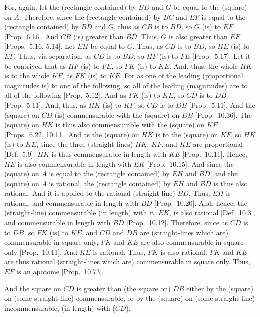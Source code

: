 \begin{Parallel}{}{}
{For, again, let the (rectangle contained) by $BD$ and $G$  be equal
to the (square) on $A$. Therefore, since the (rectangle contained) by $BC$
and $EF$ is equal to the (rectangle contained) by $BD$ and $G$, thus as
$CB$ is to $BD$, so $G$ (is) to $EF$ [Prop.~6.16].
And $CB$ (is) greater than $BD$. Thus, $G$ is also greater than $EF$
[Props.~5.16, 5.14].
Let $EH$ be equal to $G$. Thus, as $CB$ is to $BD$, so $HE$
(is) to $EF$. Thus, via separation, as $CD$ is to $BD$, so $HF$ (is) to $FE$
[Prop.~5.17]. Let it be contrived that as
$HF$ (is) to $FE$, so $FK$ (is) to $KE$. And, thus, the
whole $HK$ is to the whole $KF$, as $FK$ (is) to $KE$.
For as one of the leading (proportional magnitudes is) to one of
the following, so all of the leading (magnitudes) are to all of the
following [Prop.~5.12]. And as $FK$
(is) to $KE$, so $CD$ is to $DB$ [Prop.~5.11].  And, thus, as $HK$ (is) to $KF$, so
$CD$ is to $DB$ [Prop.~5.11].
And the (square) on  $CD$ (is) 
 commensurable with the (square) on $DB$ [Prop.~10.36]. The (square) on $HK$ is
 thus also commensurable with the (square) on $KF$ [Props.~6.22, 10.11].
  And as the (square) on $HK$ is to the (square) on $KF$, so $HK$ (is)
  to $KE$, since the three (straight-lines) $HK$, $KF$, and $KE$ are
  proportional [Def.~5.9]. $HK$ is thus commensurable
  in length with $KE$ [Prop.~10.11]. 
  Hence, $HE$ is also commensurable in length with $EK$
  [Prop.~10.15]. And since the (square) on $A$
  is equal to the (rectangle contained) by $EH$ and $BD$, and the (square)
  on $A$ is rational, the (rectangle contained) by $EH$ and $BD$ is thus
  also rational. And it is applied to the rational (straight-line) $BD$.
  Thus, $EH$ is  rational, and commensurable in length with $BD$ [Prop.~10.20]. And, hence, the (straight-line)
  commensurable (in length) with it, $EK$, is also rational [Def.~10.3], and commensurable
  in length with $BD$ [Prop.~10.12].  Therefore,
  since as $CD$  is to $DB$, so $FK$ (is) to $KE$, and $CD$ and $DB$
  are (straight-lines which are) commensurable in square only, $FK$ and $KE$ are also
  commensurable in square only [Prop.~10.11]. 
  And $KE$ is rational. Thus, $FK$ is also rational. $FK$ and
  $KE$ are thus rational (straight-lines which are) commensurable in square
  only. Thus, $EF$ is an apotome [Prop.~10.73].
  
  And the square on $CD$ is greater than (the square on) $DB$ either
  by the (square) on (some straight-line) commensurable, or by the
  (square) on (some straight-line) incommensurable, (in length) with ($CD$).
  
}
\end{Parallel}
